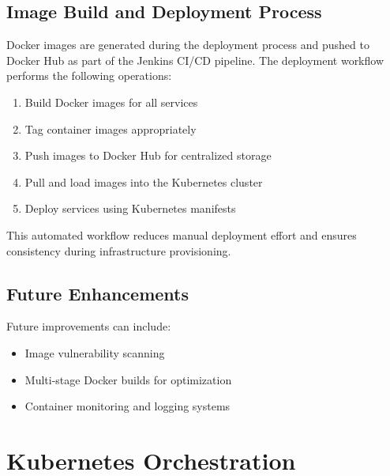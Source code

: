 \documentclass[12pt,a4paper]{report}
\begin{document}
\section{Image Build and Deployment Process}

Docker images are generated during the deployment process and pushed to Docker Hub as part of the Jenkins CI/CD pipeline. The deployment workflow performs the following operations:

\begin{enumerate}

    \item Build Docker images for all services
    \item Tag container images appropriately
    \item Push images to Docker Hub for centralized storage
    \item Pull and load images into the Kubernetes cluster
    \item Deploy services using Kubernetes manifests

\end{enumerate}

This automated workflow reduces manual deployment effort and ensures consistency during infrastructure provisioning.

\section{Future Enhancements}

Future improvements can include:

\begin{itemize}

    \item Image vulnerability scanning
    \item Multi-stage Docker builds for optimization
    \item Container monitoring and logging systems

\end{itemize}















\newpage

\chapter{Kubernetes Orchestration}
\end{document}
